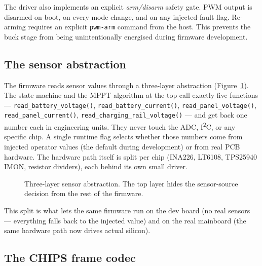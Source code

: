 The driver also implements an explicit \textit{arm/disarm} safety
gate. PWM output is disarmed on boot, on every mode change, and on
any injected-fault flag. Re-arming requires an explicit
\texttt{pwm-arm} command from the host. This prevents the buck
stage from being unintentionally energised during firmware
development.

\subsection{The sensor abstraction}

The firmware reads sensor values through a three-layer
abstraction (Figure~\ref{fig:sensor-layers}). The state machine
and the MPPT algorithm at the top call exactly five functions
--- \texttt{read\_battery\_voltage()},
\texttt{read\_battery\_current()},
\texttt{read\_panel\_voltage()}, \texttt{read\_panel\_current()},
\texttt{read\_charging\_rail\_voltage()} --- and get back one
number each in engineering units. They never touch the ADC,
I\textsuperscript{2}C, or any specific chip. A single runtime
flag selects whether those numbers come from injected operator
values (the default during development) or from real PCB
hardware. The hardware path itself is split per chip
(INA226, LT6108, TPS25940 IMON, resistor dividers), each behind
its own small driver.

\begin{figure}[ht]
\centering
{}
\caption{Three-layer sensor abstraction. The top layer hides the
sensor-source decision from the rest of the firmware.}
\label{fig:sensor-layers}
\end{figure}

This split is what lets the same firmware run on the dev board
(no real sensors --- everything falls back to the injected value)
and on the real mainboard (the same hardware path now drives
actual silicon).

\subsection{The CHIPS frame codec}

